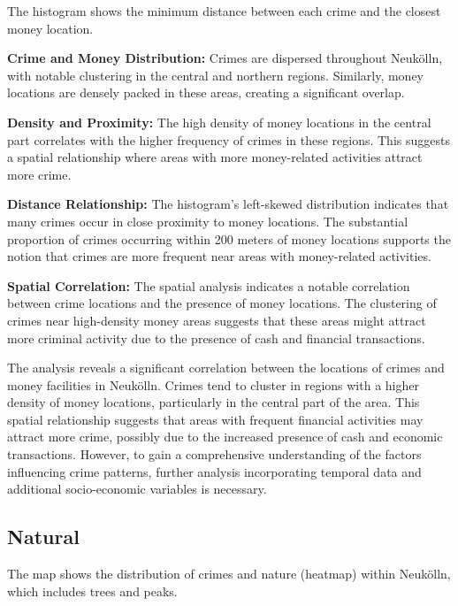 The histogram shows the minimum distance between each crime and the closest money location. 

\textbf{Crime and Money Distribution:} Crimes are dispersed throughout Neukölln, with notable clustering in the central and northern regions. Similarly, money locations are densely packed in these areas, creating a significant overlap. 

\textbf{Density and Proximity:} The high density of money locations in the central part correlates with the higher frequency of crimes in these regions. This suggests a spatial relationship where areas with more money-related activities attract more crime. 

\textbf{Distance Relationship:} The histogram's left-skewed distribution indicates that many crimes occur in close proximity to money locations. The substantial proportion of crimes occurring within 200 meters of money locations supports the notion that crimes are more frequent near areas with money-related activities. 

\textbf{Spatial Correlation:} The spatial analysis indicates a notable correlation between crime locations and the presence of money locations. The clustering of crimes near high-density money areas suggests that these areas might attract more criminal activity due to the presence of cash and financial transactions. 

The analysis reveals a significant correlation between the locations of crimes and money facilities in Neukölln. Crimes tend to cluster in regions with a higher density of money locations, particularly in the central part of the area. This spatial relationship suggests that areas with frequent financial activities may attract more crime, possibly due to the increased presence of cash and economic transactions. However, to gain a comprehensive understanding of the factors influencing crime patterns, further analysis incorporating temporal data and additional socio-economic variables is necessary. 

\subsection{Natural}
The map shows the distribution of crimes and nature (heatmap) within Neukölln, which includes trees and peaks.

